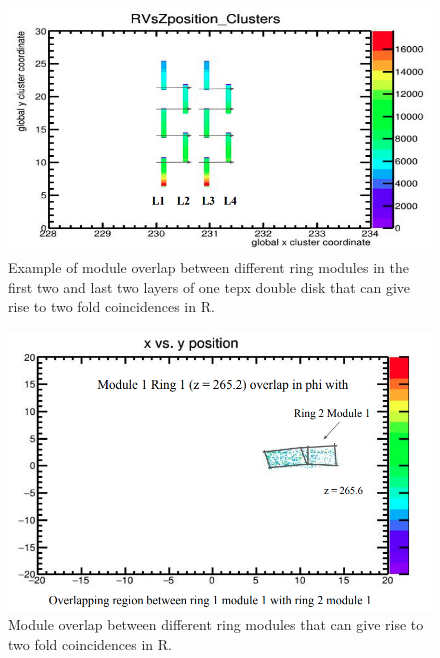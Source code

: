 \begin{figure}[!htp]
\centering
\includegraphics[width=1\textwidth]{ashish_thesis/twofoldinRmethod.png}
\caption{%
  Example of module overlap between different ring modules in the first two and last two layers of one tepx double disk that can give rise to two fold coincidences in R.
}
\label{fig:cluster_ring}
\end{figure}



\begin{figure}[!htp]
\centering
\includegraphics[width=1\textwidth]{ashish_thesis/moduleoverlapfortwofoldinR.png}
\caption{%
   Module overlap between different ring modules that can give rise to two fold coincidences in R.
}
\label{fig:cluster_ring}
\end{figure}



